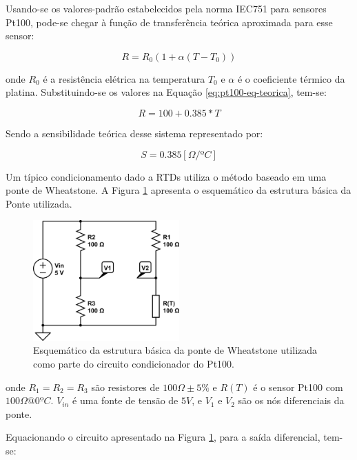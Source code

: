 \documentclass[a4paper]{instrumentacao}
\begin{document}
Usando-se os valores-padrão estabelecidos pela norma IEC751 para sensores Pt100, pode-se chegar à função de transferência teórica aproximada para esse sensor:

\begin{equation}
	R=R_0(1+\alpha(T-T_0))
	\label{eq:pt100-eq-teorica}
\end{equation}

\noindent onde $R_0$ é a resistência elétrica na temperatura $T_0$ e $\alpha$ é o coeficiente térmico da platina. Substituindo-se os valores na Equação \ref{eq:pt100-eq-teorica}, tem-se:

\begin{equation}
	R=100+0.385*T
	\label{eq:pt100-eq-teorica-valor}
\end{equation}

Sendo a sensibilidade teórica desse sistema representado por:

\begin{equation}
	S=0.385 [\Omega/ºC]
	\label{eq:pt100-sensibilidade-teorica-valor}
\end{equation}

Um típico condicionamento dado a RTDs utiliza o método baseado em uma ponte de Wheatstone. A Figura \ref{fig:termometro-ponte} apresenta o esquemático da estrutura básica da Ponte utilizada.

\begin{figure}[H]
	\centering \includegraphics[width=0.5\textwidth]{pt100-ponte.png}
	\caption{Esquemático da estrutura básica da ponte de Wheatstone utilizada como parte do circuito condicionador do Pt100.}
	\label{fig:termometro-ponte}
\end{figure}

\noindent onde $R_1=R_2=R_3$ são resistores de $100\Omega\pm5\%$  e $R(T)$ é o sensor Pt100 com $100\Omega@0ºC$. $V_{in}$ é uma fonte de tensão de $5V$, e $V_1$ e $V_2$ são os nós diferenciais da ponte.

Equacionando o circuito apresentado na Figura \ref{fig:termometro-ponte}, para a saída diferencial, tem-se:
\end{document}
